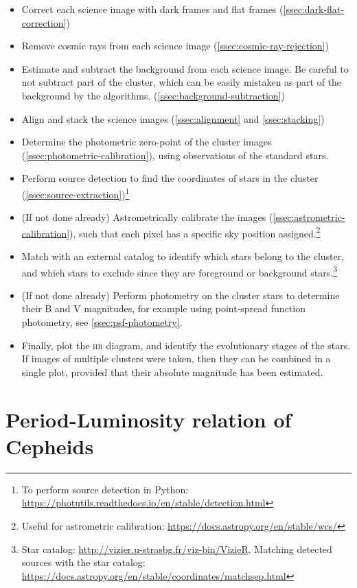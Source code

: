 \documentclass[a4paper, 11pt, fleqn]{memoir}
\begin{document}
\begin{itemize}
    \item Correct each science image with dark frames and flat frames (\cref{ssec:dark-flat-correction})
    \item Remove cosmic rays from each science image (\cref{ssec:cosmic-ray-rejection})
    \item Estimate and subtract the background from each science image. Be careful to not subtract part of the cluster, which can be easily mistaken as part of the background by the algorithms. (\cref{ssec:background-subtraction})
    \item Align and stack the science images (\cref{ssec:alignment} and \cref{ssec:stacking})
    \item Determine the photometric zero-point of the cluster images (\cref{ssec:photometric-calibration}), using observations of the standard stars.
    \item Perform source detection to find the coordinates of stars in the cluster (\cref{ssec:source-extraction})\footnote{To perform source detection in Python: \url{https://photutils.readthedocs.io/en/stable/detection.html}}
    \item (If not done already) Astrometrically calibrate the images (\cref{ssec:astrometric-calibration}), such that each pixel has a specific sky position assigned.\footnote{Useful for astrometric calibration: \url{https://docs.astropy.org/en/stable/wcs/}}
    \item Match with an external catalog to identify which stars belong to the cluster, and which stars to exclude since they are foreground or background stars.\footnote{Star catalog: \url{http://vizier.u-strasbg.fr/viz-bin/VizieR}. Matching detected sources with the star catalog: \url{https://docs.astropy.org/en/stable/coordinates/matchsep.html}}
    \item (If not done already) Perform photometry on the cluster stars to determine their B and V magnitudes, for example using point-spread function photometry, see \cref{ssec:psf-photometry}.
    \item Finally, plot the \textsc{hr} diagram, and identify the evolutionary stages of the stars. If images of multiple clusters were taken, then they can be combined in a single plot, provided that their absolute magnitude has been estimated.
\end{itemize}

\section{Period-Luminosity relation of Cepheids}
\end{document}
